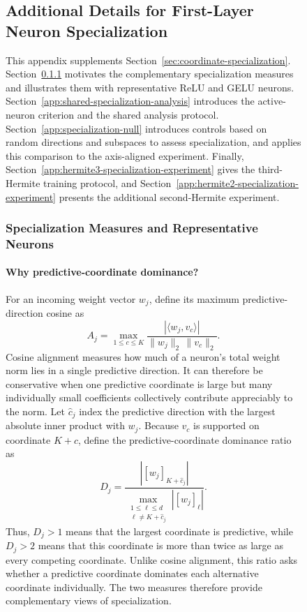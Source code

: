 \documentclass{article}
\begin{document}
\begin{figure}
\subsection{Additional Details for First-Layer Neuron Specialization}
\label{app:coordinate-specialization-details}

This appendix supplements Section~\ref{sec:coordinate-specialization}.
Section~\ref{app:specialization-measures-examples} motivates the complementary
specialization measures and illustrates them with representative ReLU and GELU
neurons. Section~\ref{app:shared-specialization-analysis} introduces the
active-neuron criterion and the shared analysis protocol.
Section~\ref{app:specialization-null} introduces controls based on random
directions and subspaces to assess specialization, and applies this
comparison to the axis-aligned experiment.
Finally, Section~\ref{app:hermite3-specialization-experiment} gives the
third-Hermite training protocol, and
Section~\ref{app:hermite2-specialization-experiment} presents the additional
second-Hermite experiment.

\subsubsection{Specialization Measures and Representative Neurons}
\label{app:specialization-measures-examples}

\paragraph{Why predictive-coordinate dominance?}
For an incoming weight vector \(w_j\), define its maximum
predictive-direction cosine as
\[
    A_j
    =
    \max_{1\leq c\leq K}
    \frac{|\langle w_j,v_c\rangle|}
    {\|w_j\|_2\,\|v_c\|_2}.
\]
Cosine alignment measures how much of a neuron's total weight norm lies in a
single predictive direction. It can therefore be conservative when one
predictive coordinate is large but many individually small coefficients
collectively contribute appreciably to the norm. Let \(\widehat c_j\) index
the predictive direction with the largest absolute inner product with
\(w_j\). Because \(v_c\) is supported on coordinate \(K+c\), define the
predictive-coordinate dominance ratio as
\[
    D_j
    =
    \frac{|[w_j]_{K+\widehat c_j}|}
    {\displaystyle
     \max_{\substack{1\leq \ell\leq d\\
                     \ell\neq K+\widehat c_j}}
     |[w_j]_\ell|}.
\]
Thus, \(D_j>1\) means that the largest coordinate is predictive, while
\(D_j>2\) means that this coordinate is more than twice as large as every
competing coordinate. Unlike cosine alignment, this ratio asks whether a
predictive coordinate dominates each alternative coordinate individually.
The two measures therefore provide complementary views of specialization.


\end{figure}
\end{document}
